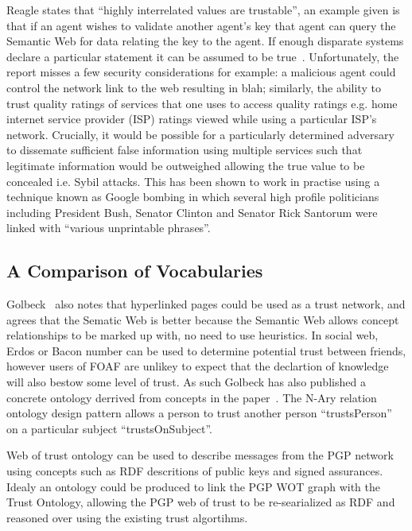\documentclass{acm_proc_article-sp}
\begin{document}
Reagle states that ``highly interrelated values are trustable'', an example given is that if an agent wishes to validate another agent's key that agent can query the Semantic Web for data relating the key to the agent.  If enough disparate systems declare a particular statement it can be assumed to be true~\cite{reagle_key_2002}. Unfortunately, the report misses a few security considerations for example: a malicious agent could control the network link to the web resulting in blah; similarly, the ability to trust quality ratings of services that one uses to access quality ratings e.g. home internet service provider (ISP) ratings viewed while using a particular ISP's network.   Crucially, it would be possible for a particularly determined adversary to dissemate sufficient false information using multiple services such that legitimate information would be outweighed allowing the true value to be concealed i.e. Sybil\cite{douceur_sybil_2002} attacks.  This has been shown to work in practise using a technique known as Google bombing in which several high profile politicians including President Bush, Senator Clinton and Senator Rick Santorum were linked with ``various unprintable phrases''\cite{yourmessagehere}.

\subsection{A Comparison of Vocabularies}
Golbeck~\cite{golbeck} also notes that hyperlinked pages could be used as a trust network, and agrees that the Sematic Web is better because the Semantic Web  allows concept relationships to be marked up with, no need to use heuristics. In social web, Erdos or Bacon number can be used to determine potential trust between friends, however users of FOAF are unlikey to expect that the declartion of knowledge will also bestow some level of trust. As such Golbeck has also published a concrete ontology derrived from concepts in the paper~\cite{jennifer_golbeck_trust_2013}. The N-Ary relation ontology design pattern allows a person to trust another person ``trustsPerson'' on a particular subject ``trustsOnSubject''.

Web of trust ontology can be used to describe messages from the PGP network\cite{_web_2004} using concepts such as RDF descritions of public keys and signed assurances.  Idealy an ontology could be produced to link the PGP WOT graph with the Trust Ontology, allowing the PGP web of trust to be re-searialized as RDF and reasoned over using the existing trust algortihms.
\end{document}
